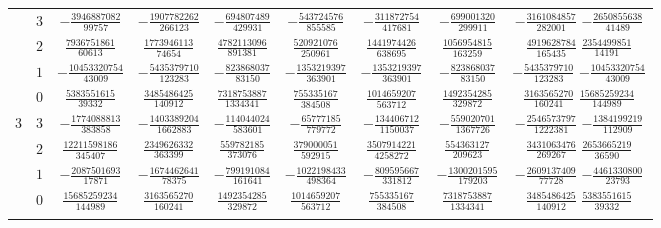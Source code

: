 \begin{table}
\begin{center}
\begin{tabular}{ccccccccc}
           &  $3$  &  $-\frac{ 3946887082}{  99757} $  &  $-\frac{ 1907782262}{  266123}$  &  $-\frac{ 694807489}{  429931} $  &  $-\frac{ 543724576}{  855585}$  &  $-\frac{ 311872754}{  417681}$  &  $-\frac{ 699001320}{  299911} $  &  $-\frac{ 3161084857}{  282001}$  $-\frac{ 2650855638}{  41489}$  \\ \addlinespace
           &  $2$  &  $ \frac{ 7936751861}{  60613} $  &  $ \frac{ 1773946113}{   74654}$  &  $ \frac{4782113096}{  891381} $  &  $ \frac{ 520921076}{  250961}$  &  $ \frac{1441974426}{  638695}$  &  $ \frac{1056954815}{  163259} $  &  $ \frac{ 4919628784}{  165435}$  $ \frac{ 2354499851}{  14191}$  \\ \addlinespace
           &  $1$  &  $-\frac{10453320754}{  43009} $  &  $-\frac{ 5435379710}{  123283}$  &  $-\frac{ 823868037}{   83150} $  &  $-\frac{1353219397}{  363901}$  &  $-\frac{1353219397}{  363901}$  &  $-\frac{ 823868037}{   83150} $  &  $-\frac{ 5435379710}{  123283}$  $-\frac{10453320754}{  43009}$  \\ \addlinespace
           &  $0$  &  $ \frac{ 5383551615}{  39332} $  &  $ \frac{ 3485486425}{  140912}$  &  $ \frac{7318753887}{ 1334341} $  &  $ \frac{ 755335167}{  384508}$  &  $ \frac{1014659207}{  563712}$  &  $ \frac{1492354285}{  329872} $  &  $ \frac{ 3163565270}{  160241}$  $ \frac{15685259234}{ 144989}$  \\ \addlinespace
      $3$  &  $3$  &  $-\frac{ 1774088813}{ 383858} $  &  $-\frac{ 1403389204}{ 1662883}$  &  $-\frac{ 114044024}{  583601} $  &  $-\frac{  65777185}{  779772}$  &  $-\frac{ 134406712}{ 1150037}$  &  $-\frac{ 559020701}{ 1367726} $  &  $-\frac{ 2546573797}{ 1222381}$  $-\frac{ 1384199219}{ 112909}$  \\ \addlinespace
           &  $2$  &  $ \frac{12211598186}{ 345407} $  &  $ \frac{ 2349626332}{  363399}$  &  $ \frac{ 559782185}{  373076} $  &  $ \frac{ 379000051}{  592915}$  &  $ \frac{3507914221}{ 4258272}$  &  $ \frac{ 554363127}{  209623} $  &  $ \frac{ 3431063476}{  269267}$  $ \frac{ 2653665219}{  36590}$  \\ \addlinespace
           &  $1$  &  $-\frac{ 2087501693}{  17871} $  &  $-\frac{ 1674462641}{   78375}$  &  $-\frac{ 799191084}{  161641} $  &  $-\frac{1022198433}{  498364}$  &  $-\frac{ 809595667}{  331812}$  &  $-\frac{1300201595}{  179203} $  &  $-\frac{ 2609137409}{   77728}$  $-\frac{ 4461330800}{  23793}$  \\ \addlinespace
           &  $0$  &  $ \frac{15685259234}{ 144989} $  &  $ \frac{ 3163565270}{  160241}$  &  $ \frac{1492354285}{  329872} $  &  $ \frac{1014659207}{  563712}$  &  $ \frac{ 755335167}{  384508}$  &  $ \frac{7318753887}{ 1334341} $  &  $ \frac{ 3485486425}{  140912}$  $ \frac{ 5383551615}{  39332}$  \\ \addlinespace

\end{tabular}
\end{center}
\end{table}
